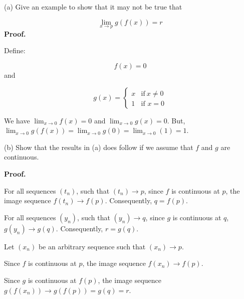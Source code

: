 \documentclass[10pt]{article}
\begin{document}
(a) Give an example to show that it may not be true that 


\begin{equation*}
\lim _{x\rightarrow p} g( f( x)) =r
\end{equation*}
\textbf{Proof.}



Define:


\begin{equation*}
f( x) =0
\end{equation*}
and


\begin{equation*}
g( x) =\begin{cases}
x & \text{if} \ x\neq 0\\
1 & \text{if } x=0
\end{cases}
\end{equation*}


We have $\displaystyle \lim _{x\rightarrow 0} f( x) =0$ and $\displaystyle \lim _{x\rightarrow 0} g( x) =0$. But, $\displaystyle \lim _{x\rightarrow 0} g( f( x)) =\lim _{x\rightarrow 0} g( 0) =\lim _{x\rightarrow 0}( 1) =1$.



(b) Show that the results in (a) does follow if we assume that $\displaystyle f$ and $\displaystyle g$ are continuous.



\textbf{Proof.}



For all sequences $\displaystyle ( t_{n})$, such that $\displaystyle ( t_{n})\rightarrow p$, since $\displaystyle f$ is continuous at $\displaystyle p$, the image sequence $\displaystyle f( t_{n})\rightarrow f( p)$. Consequently, $\displaystyle q=f( p)$.



For all sequences $\displaystyle ( y_{n})$, such that $\displaystyle ( y_{n})\rightarrow q$, since $\displaystyle g$ is continuous at $\displaystyle q$, $\displaystyle g( y_{n})\rightarrow g( q)$. Consequently, $\displaystyle r=g( q)$.



Let $\displaystyle ( x_{n})$ be an arbitrary sequence such that $\displaystyle ( x_{n})\rightarrow p$.



Since $\displaystyle f$ is continuous at $\displaystyle p$, the image sequence $\displaystyle f( x_{n})\rightarrow f( p)$.



Since $\displaystyle g$ is continuous at $\displaystyle f( p)$, the image sequence $\displaystyle g( f( x_{n}))\rightarrow g( f( p)) =g( q) =r$.
\end{document}
